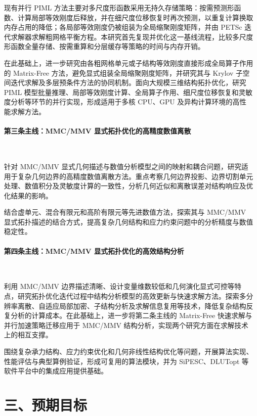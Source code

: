 \documentclass[zihao=-4,a4paper]{ctexart}
\begin{document}
现有并行 PIML 方法主要对多尺度形函数采用无持久存储策略：按需预测形函数、计算局部等效刚度后释放，并在细尺度位移恢复时再次预测，以重复计算换取内存占用的降低；各局部等效刚度仍被组装为全局缩聚刚度矩阵，并由 PETSc 迭代求解器求解粗网格平衡方程。本研究首先复现并优化这一基线流程，比较多尺度形函数全量存储、按需重算和分层缓存等策略的时间与内存开销。

在此基础上，进一步研究由各粗网格单元或子结构等效刚度直接形成全局算子作用的 Matrix-Free 方法，避免显式组装全局缩聚刚度矩阵，并研究其与 Krylov 子空间迭代求解及多层预条件方法的协同机制。面向大规模三维结构拓扑优化，研究 PIML 模型批量推理、局部等效刚度计算、全局算子作用、细尺度位移恢复和灵敏度分析等环节的并行实现，形成适用于多核 CPU、GPU 及异构计算环境的高性能求解方法。

\paragraph*{第三条主线：MMC/MMV 显式拓扑优化的高精度数值离散}~

针对 MMC/MMV 显式几何描述与数值分析模型之间的映射和耦合问题，研究适用于复杂几何边界的高精度数值离散方法。重点考察几何边界投影、边界切割单元处理、数值积分及灵敏度计算的一致性，分析几何近似和离散误差对结构响应及优化结果的影响。

结合虚单元、混合有限元和高阶有限元等先进数值方法，探索其与 MMC/MMV 显式拓扑描述的结合方式，提高复杂几何结构和应力约束问题中的分析精度与数值稳定性。

\paragraph*{第四条主线：MMC/MMV 显式拓扑优化的高效结构分析}~

利用 MMC/MMV 边界描述清晰、设计变量维数较低和几何演化显式可控等特点，研究拓扑优化迭代过程中结构分析模型的高效更新与快速求解方法。探索多分辨率离散、自适应局部加密、子结构分析及求解信息复用等技术，降低复杂结构反复分析的计算成本。在此基础上，进一步将第二条主线的 Matrix-Free 快速求解与并行加速策略迁移应用于 MMC/MMV 结构分析，实现两个研究方面在求解技术上的相互支撑。

围绕复杂承力结构、应力约束优化和几何非线性结构优化等问题，开展算法实现、性能评估与典型算例验证，形成可复用的算法模块，并为 SiPESC、DLUTopt 等软件平台中的集成应用提供基础。

\section*{三、预期目标}
\end{document}
